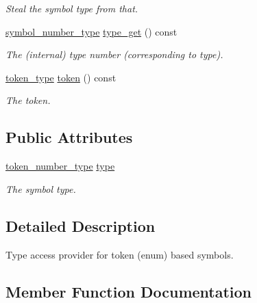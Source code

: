 \begin{DoxyCompactItemize}
\begin{DoxyCompactList}\small\item\em Steal the symbol type from {\itshape that}. \end{DoxyCompactList}\item 
\hyperlink{classyy_1_1parser_a522f5c6c3481d9285b0b991ac12292eb}{symbol\+\_\+number\+\_\+type} \hyperlink{structyy_1_1parser_1_1by__type_a2324af0aef49d4a89ef346ebf5d66559}{type\+\_\+get} () const 
\begin{DoxyCompactList}\small\item\em The (internal) type number (corresponding to {\itshape type}). \end{DoxyCompactList}\item 
\hypertarget{structyy_1_1parser_1_1by__type_ab13b34d01faa03e8e5c24069aedaa225}{}\hyperlink{classyy_1_1parser_ac1ba3f834abfa251ea746c4ca8da5a85}{token\+\_\+type} \hyperlink{structyy_1_1parser_1_1by__type_ab13b34d01faa03e8e5c24069aedaa225}{token} () const \label{structyy_1_1parser_1_1by__type_ab13b34d01faa03e8e5c24069aedaa225}

\begin{DoxyCompactList}\small\item\em The token. \end{DoxyCompactList}\end{DoxyCompactItemize}
\subsection*{Public Attributes}
\begin{DoxyCompactItemize}
\item 
\hyperlink{classyy_1_1parser_a9e3963a210d7f2b655d87ca544223ead}{token\+\_\+number\+\_\+type} \hyperlink{structyy_1_1parser_1_1by__type_aecfb7b8174ce27df6dc0e6ef919bfb48}{type}
\begin{DoxyCompactList}\small\item\em The symbol type. \end{DoxyCompactList}\end{DoxyCompactItemize}


\subsection{Detailed Description}
Type access provider for token (enum) based symbols. 

\subsection{Member Function Documentation}
\hypertarget{structyy_1_1parser_1_1by__type_a2324af0aef49d4a89ef346ebf5d66559}{}
